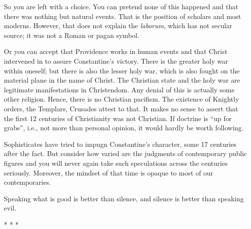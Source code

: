 So you are left with a choice. You can pretend none of this happened and that there was nothing but natural events. That is the position of scholars and most moderns. However, that does not explain the
\emph{laborum}, which has not secular source; it was not a Roman or pagan symbol.

Or you can accept that Providence works in human events and that Christ intervened in to assure Constantine's victory. There is the greater holy war within oneself; but there is also the lesser holy war, which is also fought on the material plane in the name of Christ. The Christian state and the holy war are legitimate manifestations in Christendom. Any denial of this is actually some other religion. Hence, there is no Christian pacifism. The existence of Knightly orders, the Templars, Crusades attest to that. It makes no sense to assert that the first 12 centuries of Christianity was not Christian. If doctrine is ``up for grabs'', i.e., not more than personal opinion, it would hardly be worth following.

Sophisticates have tried to impugn Constantine's character, some 17 centuries after the fact. But consider how varied are the judgments of contemporary public figures and you will never again take such speculations across the centuries seriously. Moreover, the mindset of that time is opaque to most of our contemporaries.

Speaking what is good is better than silence, and silence is better than speaking evil.



\begin{center}* * *\end{center}

